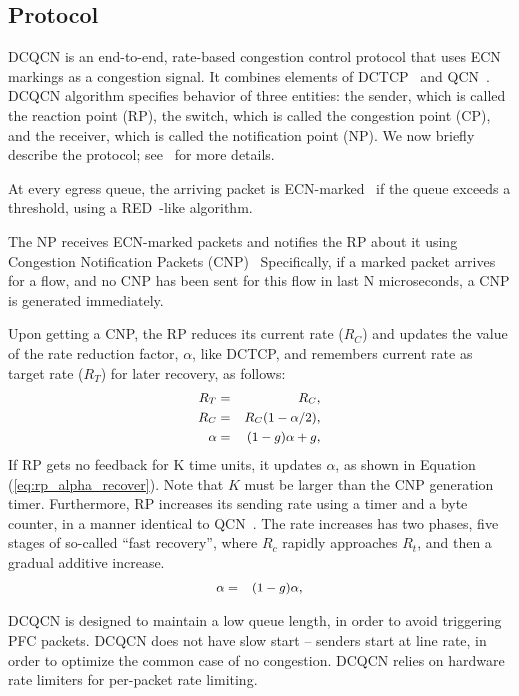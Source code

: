 \subsection{Protocol}

DCQCN is an end-to-end, rate-based congestion control protocol that uses
ECN~\cite{ecn} markings as a congestion signal.  It combines elements of
DCTCP~\cite{dctcp} and QCN~\cite{qcn}. DCQCN algorithm specifies behavior of
three entities: the sender, which is called the reaction point (RP), the switch,
which is called the congestion point (CP), and the receiver, which is called the
notification point (NP). We now briefly describe the protocol; see~\cite{dcqcn}
for more details.

 At every egress queue, the arriving packet is
ECN-marked~\cite{ecn} if the queue exceeds a threshold, using a
RED~\cite{red}-like algorithm.

 The NP receives ECN-marked packets and notifies the RP about
it using Congestion Notification Packets (CNP)~\cite{rocev2} Specifically, if a
marked packet arrives for a flow, and no CNP has been sent for this flow in last
N microseconds, a CNP is generated immediately.

 Upon getting a CNP, the RP reduces its current rate ($R_C$)
and updates the value of the rate reduction factor, $\alpha$, like DCTCP, and
remembers current rate as target rate ($R_T$) for later recovery, as follows:
\begin{equation} \small \begin{aligned} R_T &=& R_C,	\\ R_C &=& R_C (1 -
\alpha/2),  \\ \alpha &=& (1-g)\alpha + g, \end{aligned} \label{eq:rp_dec}
\end{equation} If RP gets no feedback for K time units, it updates $\alpha$, as
shown in Equation (\ref{eq:rp_alpha_recover}). Note that $K$ must be larger than
the CNP generation timer. Furthermore, RP increases its sending rate using a
timer and a byte counter, in a manner identical to QCN~\cite{qcn}. The rate
increases has two phases, five stages of so-called ``fast recovery'', where
$R_c$ rapidly approaches $R_t$, and then a gradual additive increase.
\begin{equation} \small \begin{aligned} \alpha &=& (1-g)\alpha, \end{aligned}
\label{eq:rp_alpha_recover} \end{equation}

DCQCN is designed to maintain a low queue length, in order to avoid triggering
PFC packets. DCQCN does not have slow start -- senders start at line rate, in
order to optimize the common case of no congestion. DCQCN relies on hardware
rate limiters for per-packet rate limiting. 
